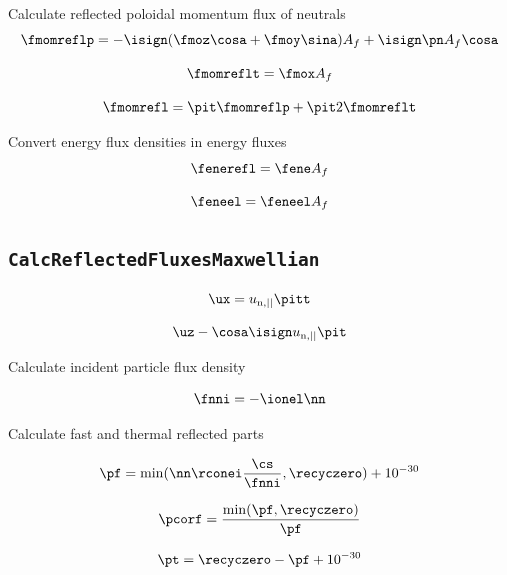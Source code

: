 Calculate reflected poloidal momentum flux of neutrals
\begin{equation}
    \fmomreflp = - \isign (\fmoz \cosa + \fmoy \sina ) A_f + \isign \pn A_f \cosa
\end{equation}

\begin{equation}
    \fmomreflt = \fmox A_f
\end{equation}

\begin{equation}
    \fmomrefl = \pit \fmomreflp + \pit2 \fmomreflt
\end{equation}

Convert energy flux densities in energy fluxes
\begin{equation}
    \fenerefl = \fene A_f
\end{equation}

\begin{equation}
    \feneel = \feneel A_f
\end{equation}

\subsection{\texttt{CalcReflectedFluxesMaxwellian}}

\begin{equation}
    \ux = u_{\mathrm{n},||} \pitt
\end{equation}

\begin{equation}
    \uz -\cosa \isign u_{\mathrm{n},||} \pit
\end{equation}

Calculate incident particle flux density

\begin{equation}
    \fnni = - \ionel \nn
\end{equation}

Calculate fast and thermal reflected parts

\begin{equation}
    \pf = \mathrm{min}(\nn \rconei \frac{\cs}{\fnni}, \recyczero) + 10^{-30}
\end{equation}

\begin{equation}
    \pcorf = \frac{\mathrm{min}(\pf,\recyczero)}{\pf}
\end{equation}

\begin{equation}
    \pt = \recyczero - \pf + 10^{-30}
\end{equation}

